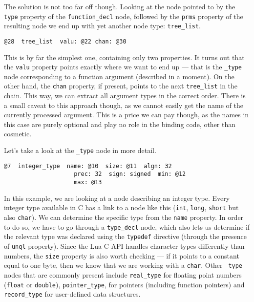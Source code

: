 \documentclass[polish, english]{iithesis}
\begin{document}
The solution is not too far off though.
Looking at the node pointed to by the \texttt{type} property of the \texttt{function\_decl} node, followed by the \texttt{prms} property of the resulting node we end up with yet another node type: \texttt{tree\_list}.
\begin{lstlisting}[caption=Example \texttt{tree\_list} node]
  @28  tree_list  valu: @22 chan: @30
\end{lstlisting}
This is by far the simplest one, containing only two properties. 
It turns out that the \texttt{valu} property points exactly where we want to end up --- that is the \texttt{\_type} node corresponding to a function argument (described in a moment).
On the other hand, the \texttt{chan} property, if present, points to the next \texttt{tree\_list} in the chain.
This way, we can extract all argument types in the correct order.
There is a small caveat to this approach though, as we cannot easily get the name of the currently processed argument.
This is a price we can pay though, as the names in this case are purely optional and play no role in the binding code, other than cosmetic. 

Let's take a look at the \texttt{\_type} node in more detail.
\begin{lstlisting}[caption=Example \texttt{\_type} node]
  @7  integer_type  name: @10  size: @11  algn: 32      
                    prec: 32  sign: signed  min: @12     
                    max: @13
\end{lstlisting}
In this example, we are looking at a node describing an integer type.
Every integer type available in C has a link to a node like this (\texttt{int}, \texttt{long}, \texttt{short} but also \texttt{char}).
We can determine the specific type from the \texttt{name} property.
In order to do so, we have to go through a \texttt{type\_decl} node, which also lets us determine if the relevant type was declared using the \texttt{typedef} directive (through the presence of \texttt{unql} property).
Since the Lua C API handles character types differently than numbers, the \texttt{size} property is also worth checking --- if it points to a constant equal to one byte, then we know that we are working with a \texttt{char}.
Other \texttt{\_type} nodes that are commonly present include \texttt{real\_type} for floating point numbers (\texttt{float} or \texttt{double}), \texttt{pointer\_type}, for pointers (including function pointers) and \texttt{record\_type} for user-defined data structures.
\end{document}
